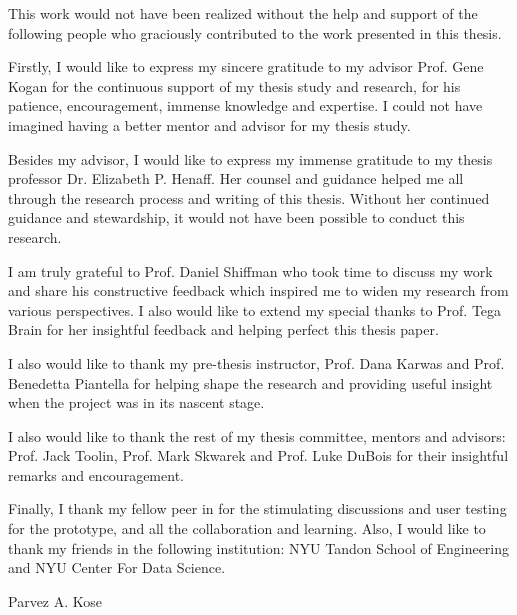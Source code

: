 %
%
%
%
%

\begin{acknowledgments} 

This work would not have been realized without the help and support of the following people who graciously contributed to the work presented in this thesis.

Firstly, I would like to express my sincere gratitude to my advisor Prof. Gene Kogan for the continuous support of my thesis study and research, for his patience, encouragement, immense knowledge and expertise. I could not have imagined having a better mentor and advisor for my thesis study.

Besides my advisor, I would like to express my immense gratitude to my thesis professor Dr. Elizabeth P. Henaff. Her counsel and guidance helped me all through the research process and writing of this thesis. Without her continued guidance and stewardship, it would not have been possible to conduct this research.

I am truly grateful to Prof. Daniel Shiffman who took time to discuss my work and share his constructive feedback which inspired me to widen my research from various perspectives. I also would like to extend my special thanks to Prof. Tega Brain for her insightful feedback and helping perfect this thesis paper.

I also would like to thank my pre-thesis instructor, Prof. Dana Karwas and Prof. Benedetta Piantella for helping shape the research and providing useful insight when the project was in its nascent stage.

I also would like to thank the rest of my thesis committee, mentors and advisors: Prof. Jack Toolin, Prof. Mark Skwarek and Prof. Luke DuBois for their insightful remarks and encouragement.

Finally, I thank my fellow peer in for the stimulating discussions and user testing for the prototype, and all the collaboration and learning. Also, I would like to thank my friends in the following institution: NYU Tandon School of Engineering and NYU Center For Data Science. %

\vspace*{-1em}
\begin{flushright} 
Parvez A. Kose
\end{flushright}
\end{acknowledgments}

